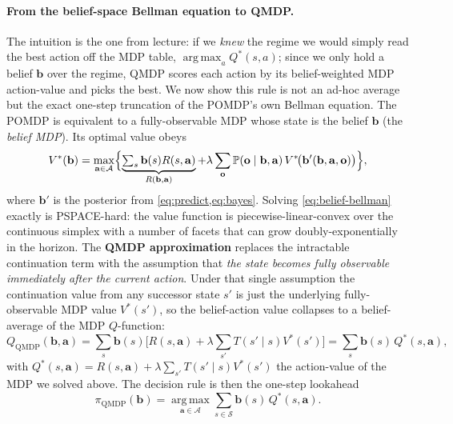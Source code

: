 \documentclass[11pt]{article}
\theoremstyle{plain1}
\theoremstyle{definition1}
\newcommand{\Prb}{\mathbb{P}}
\newcommand{\argmax}{\operatorname*{arg\,max}}
\newcommand{\1}{\mathbf{1}}
\newcommand{\bel}{\mathbf{b}}
\newcommand{\state}{\mathcal{S}}
\newcommand{\action}{\mathcal{A}}
\begin{document}
\paragraph{From the belief-space Bellman equation to QMDP.} The intuition is the one from lecture: if we \emph{knew} the regime we would simply read the best action off the MDP table, $\argmax_a Q^\ast(s,a)$; since we only hold a belief $\bel$ over the regime, QMDP scores each action by its belief-weighted MDP action-value and picks the best. We now show this rule is not an ad-hoc average but the exact one-step truncation of the POMDP's own Bellman equation. The POMDP is equivalent to a fully-observable MDP whose state is the belief $\bel$ (the \emph{belief MDP}). Its optimal value obeys
\begin{equation}\label{eq:belief-bellman}
V^\ast(\bel)=\max_{\mathbf{a}\in\action}\Bigl\{\underbrace{\textstyle\sum_s \bel(s)R(s,\mathbf{a})}_{R(\bel,\mathbf{a})}
+\lambda\sum_{\mathbf{o}}\Prb(\mathbf{o}\mid\bel,\mathbf{a})\,V^\ast\!\bigl(\bel'(\bel,\mathbf{a},\mathbf{o})\bigr)\Bigr\},
\end{equation}
where $\bel'$ is the posterior from \cref{eq:predict,eq:bayes}. Solving \cref{eq:belief-bellman} exactly is PSPACE-hard: the value function is piecewise-linear-convex over the continuous simplex with a number of facets that can grow doubly-exponentially in the horizon. The \textbf{QMDP approximation} \cite{littman1995,hauskrecht2000} replaces the intractable continuation term with the assumption that \emph{the state becomes fully observable immediately after the current action}. Under that single assumption the continuation value from any successor state $s'$ is just the underlying fully-observable MDP value $V^\ast(s')$, so the belief-action value collapses to a belief-average of the MDP $Q$-function:
\begin{equation}\label{eq:qmdp-derivation}
\textstyle
Q_{\mathrm{QMDP}}(\bel,\mathbf{a})
=\sum_s \bel(s)\bigl[R(s,\mathbf{a})+\lambda\sum_{s'}T(s'\mid s)V^\ast(s')\bigr]
=\sum_s \bel(s)\,Q^\ast(s,\mathbf{a}),
\end{equation}
with $Q^\ast(s,\mathbf{a})=R(s,\mathbf{a})+\lambda\sum_{s'}T(s'\mid s)V^\ast(s')$ the action-value of the MDP we solved above. The decision rule is then the one-step lookahead
\begin{equation}\label{eq:qmdp}
\boxed{\;\pi_{\mathrm{QMDP}}(\bel)=\argmax_{\mathbf{a}\in\action}\sum_{s\in\state}\bel(s)\,Q^\ast(s,\mathbf{a}).\;}
\end{equation}
\end{document}
